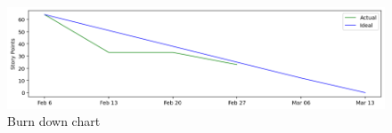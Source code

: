 \begin{figure}[h]
\begin{center}
\includegraphics[width=\textwidth]{images/burndown chart.png}
\end{center}
\caption{Burn down chart}
\label{fig:burndown}
\end{figure}